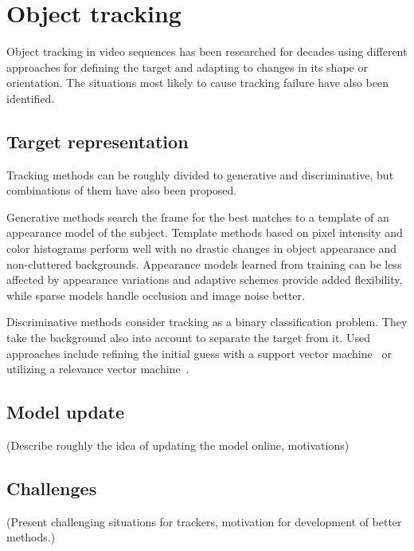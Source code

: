 \section{Object tracking}
Object tracking in video sequences has been researched for decades using different
approaches for defining the target and adapting to changes in its shape or orientation.
The situations most likely to cause tracking failure have also been identified.

\subsection{Target representation}
Tracking methods can be roughly divided to generative and discriminative, but combinations
of them have also been proposed.

Generative methods search the frame for the best matches to a template of an appearance
model of the subject. Template methods based on pixel intensity and color histograms
perform well with no drastic changes in object appearance and non-cluttered backgrounds.
Appearance models learned from training can be less affected by appearance variations
and adaptive schemes provide added flexibility, while sparse models handle occlusion
and image noise better.~\cite{OBJECT_PLS}

Discriminative methods consider tracking as a binary classification problem. They take
the background also into account to separate the target from it. Used approaches
include refining the initial guess with a support vector machine~\cite{SVT} or utilizing
a relevance vector machine~\cite{SPARSE_BAYESIAN}.

\subsection{Model update}
(Describe roughly the idea of updating the model online, motivations)

\subsection{Challenges}
(Present challenging situations for trackers, motivation for development of better
methods.)
